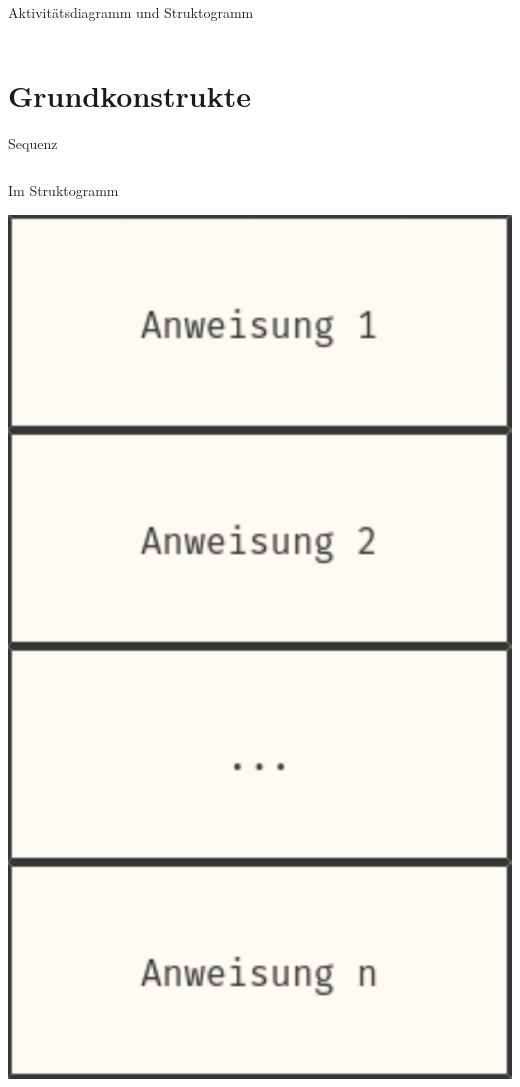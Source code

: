 \documentclass[xelatex,aspectratio=169]{beamer}
\begin{document}
\begin{frame}{Aktivitätsdiagramm und Struktogramm}
\begin{columns}
\begin{column}{.3\linewidth}
    \end{column}
  \end{columns}
\end{frame}

\section{Grundkonstrukte}

\begin{frame}{Sequenz}

  \begin{columns}[t]
    \begin{column}{.3\linewidth}
      \begin{block}{Im Struktogramm}
        \begin{minipage}[c][.7\textheight][c]{\textwidth}
          \centering
          \includegraphics[height=.7\textheight]{fig/algorithmus_sequenz_struktogram.pdf}

\end{minipage}
\end{block}
\end{column}
\end{columns}
\end{frame}
\end{document}
